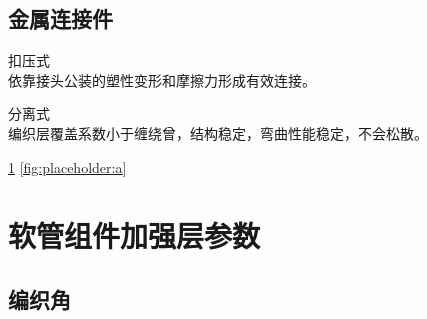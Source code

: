 \subsection{金属连接件}
	\begin{asparaenum}
		\item 扣压式\\
		依靠接头公装的塑性变形和摩擦力形成有效连接。
		\item 分离式\\
		编织层覆盖系数小于缠绕曾，结构稳定，弯曲性能稳定，不会松散。
		
		\ref{fig:placeholder}
		\ref{fig:placeholder:a}
		\begin{figure}[!htbp]
			\centering
			\hspace{1cm}
			\label{fig:placeholder}
		\end{figure}
	\end{asparaenum}	
	





	




\section{软管组件加强层参数}
\label{sec:parameter}
\subsection{编织角}



